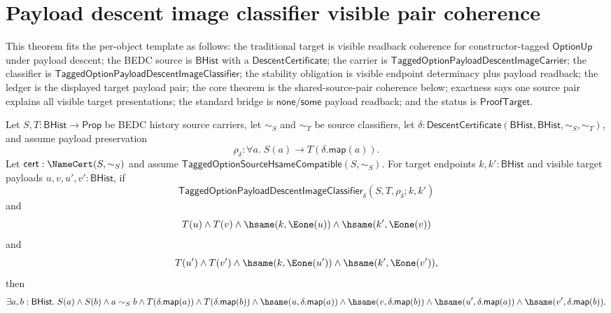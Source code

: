 \section{Payload descent image classifier visible pair coherence}
\label{sec:option-payload-descent-image-visible-pair-coherence}

\begin{theorem}
\label{thm:tagged-option-payload-descent-image-classifier-visible-payload-pair-coherence}
This theorem fits the per-object template as follows: the traditional target is
visible readback coherence for constructor-tagged $\mathsf{OptionUp}$ under
payload descent; the BEDC source is $\mathsf{BHist}$ with a
$\mathsf{DescentCertificate}$; the carrier is
$\mathsf{TaggedOptionPayloadDescentImageCarrier}$; the classifier is
$\mathsf{TaggedOptionPayloadDescentImageClassifier}$; the stability obligation is
visible endpoint determinacy plus payload readback; the ledger is the displayed
target payload pair; the core theorem is the shared-source-pair coherence below;
exactness says one source pair explains all visible target presentations; the
standard bridge is $\mathsf{none}$/$\mathsf{some}$ payload readback; and the
status is $\mathsf{ProofTarget}$.

Let $S,T:\mathsf{BHist}\to\mathsf{Prop}$ be BEDC history source carriers, let
$\sim_S$ and $\sim_T$ be source classifiers, let
$\delta:\mathsf{DescentCertificate}(\mathsf{BHist},\mathsf{BHist},\sim_S,\sim_T)$,
and assume payload preservation
$$
\rho_{\delta}:\forall a.\;S(a)\to T(\delta.\mathsf{map}(a)).
$$
Let $\mathsf{cert}:\NameCert(S,\sim_S)$ and assume
$\mathsf{TaggedOptionSourceHsameCompatible}(S,\sim_S)$. For target endpoints
$k,k':\mathsf{BHist}$ and visible target payloads
$u,v,u',v':\mathsf{BHist}$, if
$$
\mathsf{TaggedOptionPayloadDescentImageClassifier}_{\delta}
(S,T,\rho_{\delta};k,k')
$$
and
$$
T(u)\land T(v)\land
\hsame(k,\Eone(u))\land
\hsame(k',\Eone(v))
$$
and
$$
T(u')\land T(v')\land
\hsame(k,\Eone(u'))\land
\hsame(k',\Eone(v')),
$$
then
$$
\exists a,b:\mathsf{BHist}.\;
S(a)\land S(b)\land a\sim_S b\land
T(\delta.\mathsf{map}(a))\land T(\delta.\mathsf{map}(b))\land
\hsame(u,\delta.\mathsf{map}(a))\land
\hsame(v,\delta.\mathsf{map}(b))\land
\hsame(u',\delta.\mathsf{map}(a))\land
\hsame(v',\delta.\mathsf{map}(b)).
$$
\end{theorem}
